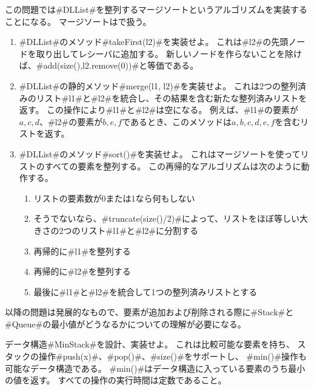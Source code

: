 \begin{exc}
  この問題では#DLList#を整列するマージソートというアルゴリズムを実装することになる。
  マージソートはで扱う。
  \begin{enumerate}
    \item #DLList#のメソッド#takeFirst(l2)#を実装せよ。
	これは#l2#の先頭ノードを取り出してレシーバに追加する。
	新しいノードを作らないことを除けば、#add(size(),l2.remove(0))#と等価である。
    \item #DLList#の静的メソッド#merge(l1, l2)#を実装せよ。
	これは2つの整列済みのリスト#l1#と#l2#を統合し、その結果を含む新たな整列済みリストを返す。
	この操作により#l1#と#l2#は空になる。
	例えば、#l1#の要素が$a,c,d$、#l2#の要素が$b,e,f$であるとき、このメソッドは$a,b,c,d,e,f$を含むリストを返す。
    \item #DLList#のメソッド#sort()#を実装せよ。
	これはマージソートを使ってリストのすべての要素を整列する。
	この再帰的なアルゴリズムは次のように動作する。
       \begin{enumerate}
          \item リストの要素数が0または1なら何もしない
          \item そうでないなら、#truncate(size()/2)#によって、リストをほぼ等しい大きさの2つのリスト#l1#と#l2#に分割する
          \item 再帰的に#l1#を整列する
          \item 再帰的に#l2#を整列する
          \item 最後に#l1#と#l2#を統合して1つの整列済みリストとする
       \end{enumerate}
  \end{enumerate}
\end{exc}

以降の問題は発展的なもので、要素が追加および削除される際に#Stack#と#Queue#の最小値がどうなるかについての理解が必要になる。

\begin{exc}
  データ構造#MinStack#を設計、実装せよ。
  これは比較可能な要素を持ち、
  スタックの操作#push(x)#、#pop()#、#size()#をサポートし、
  #min()#操作も可能なデータ構造である。
  #min()#はデータ構造に入っている要素のうち最小の値を返す。
  すべての操作の実行時間は定数であること。
\end{exc}

